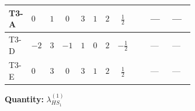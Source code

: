 \documentclass[8pt]{article}
\begin{document}
\begin{landscape}
\begin{longtable}{@{}llcccccc >{\raggedright\arraybackslash}p{0.21\linewidth} >{\raggedright\arraybackslash}p{0.21\linewidth} >{\raggedright\arraybackslash}p{0.21\linewidth}@{}}
\midrule
T3-A & $0$ & $1$ & $0$ & $3$ & $1$ & $2$ & $\frac{1}{2}$ & \scriptsize\adjustbox{max width=\linewidth}{$\begin{gathered} -4 \operatorname{Tr}\!\left({y_1}\,\left({y_1}\right)^{\dagger}\,{Y_e}\,\left({Y_e}\right)^{\dagger}\right)\end{gathered}$} & --- & --- \\
\midrule
T3-D & $-2$ & $3$ & $-1$ & $1$ & $0$ & $2$ & $-\frac{1}{2}$ & \scriptsize\adjustbox{max width=\linewidth}{$\begin{gathered} -2 \operatorname{Tr}\!\left({y_1}\,\left({y_1}\right)^{\dagger}\,{Y_e}\,\left({Y_e}\right)^{\dagger}\right)\end{gathered}$} & --- & --- \\
\midrule
T3-E & $0$ & $3$ & $0$ & $3$ & $1$ & $2$ & $\frac{1}{2}$ & \scriptsize\adjustbox{max width=\linewidth}{$\begin{gathered} -2 \operatorname{Tr}\!\left({y_1}\,\left({y_1}\right)^{\dagger}\,{Y_e}\,\left({Y_e}\right)^{\dagger}\right)\end{gathered}$} & --- & --- \\
\midrule
\bottomrule
\end{longtable}
\clearpage
\noindent\textbf{Quantity: }$\lambda_{HS_1}^{(1)}$\par\smallskip

\end{landscape}
\end{document}
